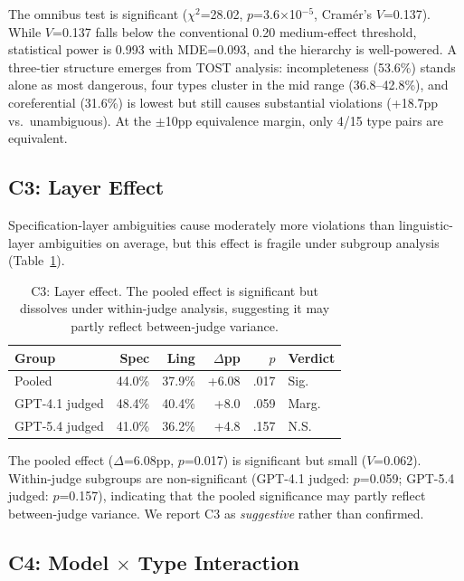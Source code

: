 \documentclass[11pt]{article}
\begin{document}
The omnibus test is significant ($\chi^2$=28.02, $p$=3.6$\times$10$^{-5}$, Cram\'er's $V$=0.137).
While $V$=0.137 falls below the conventional 0.20 medium-effect threshold, statistical power is 0.993 with MDE=0.093, and the hierarchy is well-powered.
A three-tier structure emerges from TOST analysis: incompleteness (53.6\%) stands alone as most dangerous, four types cluster in the mid range (36.8--42.8\%), and coreferential (31.6\%) is lowest but still causes substantial violations (+18.7pp vs.\ unambiguous).
At the $\pm$10pp equivalence margin, only 4/15 type pairs are equivalent.

\subsection{C3: Layer Effect}
\label{sec:c3}

Specification-layer ambiguities cause moderately more violations than linguistic-layer ambiguities on average, but this effect is fragile under subgroup analysis (Table~\ref{tab:c3}).

\begin{table}[t]
\centering
\small
\begin{tabular}{lrrrrl}
\toprule
\textbf{Group} & \textbf{Spec} & \textbf{Ling} & \textbf{$\Delta$pp} & \textbf{$p$} & \textbf{Verdict} \\
\midrule
Pooled & 44.0\% & 37.9\% & +6.08 & .017 & Sig. \\
GPT-4.1 judged & 48.4\% & 40.4\% & +8.0 & .059 & Marg. \\
GPT-5.4 judged & 41.0\% & 36.2\% & +4.8 & .157 & N.S. \\
\bottomrule
\end{tabular}
\caption{C3: Layer effect. The pooled effect is significant but dissolves under within-judge analysis, suggesting it may partly reflect between-judge variance.}
\label{tab:c3}
\end{table}

The pooled effect ($\Delta$=6.08pp, $p$=0.017) is significant but small ($V$=0.062).
Within-judge subgroups are non-significant (GPT-4.1 judged: $p$=0.059; GPT-5.4 judged: $p$=0.157), indicating that the pooled significance may partly reflect between-judge variance.
We report C3 as \emph{suggestive} rather than confirmed.

\subsection{C4: Model $\times$ Type Interaction}
\label{sec:c4}
\end{document}
